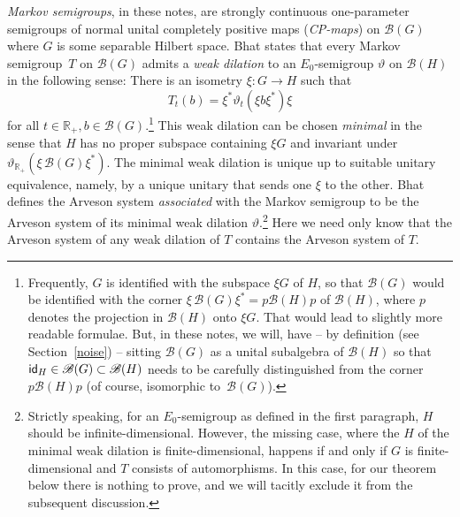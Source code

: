 \documentclass[11pt]{article}
\numberwithin{equation}{section}
\newcommand{\msf}[1]{\text{\small $\sf{#1}$}}
\newcommand{\eus}[1]{\mathscr{#1}}
\newcommand{\bb}[1]{\mathbb{#1}}
\newcommand{\vt}{\vartheta}
\DeclareMathOperator{\id}{\normalfont\msf{id}}
\newcommand{\R}{\bb{R}}
\newcommand{\sB}{\eus{B}}
\numberwithin{equation}{section}
\newcommand{\bemp}{\begin{emp}}
\newcommand{\eemp}{\end{emp}}
\begin{document}
\bemp \label{WD}
\emph{Markov semigroups}, in these notes, are strongly continuous one-parameter semigroups of normal unital completely positive maps (\emph{CP-maps}) on $\sB(G)$ where $G$ is some separable Hilbert space. Bhat \cite[Theorem~4.7]{Bha96} states that every Markov semigroup~$T$ on $\sB(G)$ admits a \emph{weak dilation} to an $E_0$-semigroup $\vt$ on $\sB(H)$ in the following sense: There is an isometry $\xi\colon G\rightarrow H$ such that
\[
T_t(b)=\xi^*\vt_t(\xi b\xi^*)\xi
\]
for all $t\in\R_+,b\in\sB(G)$.\footnote{Frequently, $G$ is identified with the subspace $\xi G$ of $H$, so that $\sB(G)$ would be identified with the corner $\xi\,\sB(G)\xi^*=p\sB(H)p$ of $\sB(H)$, where $p$ denotes the projection in $\sB(H)$ onto $\xi G$. That would lead to slightly more readable formulae. But, in these notes, we will, have -- by definition (see Section~\ref{noise}) -- sitting $\sB(G)$ as a unital subalgebra of $\sB(H)$ so that $\id_H\in\sB(G)\subset\sB(H)$ needs to be carefully distinguished from the corner $p\sB(H)p$ (of course, isomorphic to~$\sB(G)$).}
This weak dilation can be chosen \emph{minimal} in the sense that $H$ has no proper subspace containing $\xi G$ and invariant under $\vt_{\R_+}(\xi\,\sB(G)\xi^*)$. The minimal weak dilation is unique up to suitable unitary equivalence, namely, by a unique unitary that sends one $\xi$ to the other. Bhat \cite{Bha96} defines the Arveson system \emph{associated} with the Markov semigroup to be the Arveson system of its minimal weak dilation $\vt$.\footnote{Strictly speaking, for an $E_0$-semigroup as defined in the first paragraph, $H$ should be infinite-dimensional. However, the missing case, where the $H$ of the minimal weak dilation is finite-dimensional, happens if and only if $G$ is finite-dimensional and $T$ consists of automorphisms. In this case, for our theorem below there is nothing to prove, and we will tacitly exclude it from the subsequent discussion.} Here we need only know that the Arveson system of any weak dilation of $T$ contains the Arveson system of $T$.
\eemp
\end{document}
